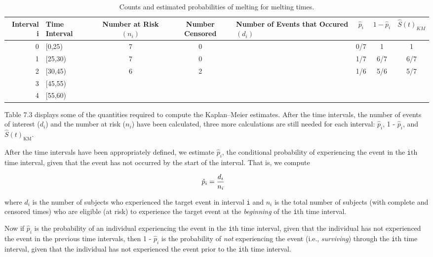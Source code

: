 \documentclass[
]{report}
\begin{document}
\begin{table}[!h]
\centering
\caption{\label{tab:tab93}Counts and estimated probabilities of melting for melting times.}
\centering
\begin{tabular}[t]{rlcc>{\centering\arraybackslash}p{2.5cm}ccc}
\toprule
Interval i & Time Interval & Number at Risk $(n_i)$ & Number Censored & Number of Events that Occured $(d_i)$ & $\hat{p}_i$ & $1 - \hat{p}_i$ & $\hat{S}(t)_{KM}$\\
\midrule
0 & {}[0,25) & 7 & 0 & 0 & 0/7 & 1 & 1\\
1 & {}[25,30) & 7 & 0 & 1 & 1/7 & 6/7 & 6/7\\
2 & {}[30,45) & 6 & 2 & 1 & 1/6 & 5/6 & 5/7\\
3 & {}[45,55) &  &  &  &  &  & \\
4 & {}[55,60) &  &  &  &  &  & \\
\bottomrule
\end{tabular}
\end{table}

Table 7.3 displays some of the quantities required to compute the Kaplan--Meier estimates. After the time intervals, the number of events of interest (\(d_i\)) and the number at risk (\(\scriptstyle n_i\)) have been calculated, three more calculations are still needed for each interval: \(\scriptstyle \hat p_i\), 1 - \(\scriptstyle \hat p_i\), and \(\scriptstyle \hat S(t)_{\text{KM}}\).

After the time intervals have been appropriately defined, we estimate \(\scriptstyle \hat p_i\), the conditional probability of experiencing the event in the \texttt{i}th time interval, given that the event has not occurred by the start of the interval. That is, we compute

\begin{align}
\hat p_i &= \frac{d_i}{n_i}
\notag
\end{align}

where \(\scriptstyle d_i\) is the number of subjects who experienced the target event in interval \texttt{i} and \(\scriptstyle n_i\) is the total number of subjects (with complete and censored times) who are eligible (at risk) to experience the target event at the \emph{beginning} of the \texttt{i}th time interval.

Now if \(\scriptstyle \hat p_i\) is the probability of an individual experiencing the event in the \texttt{i}th time interval, given that the individual has not experienced the event in the previous time intervals, then 1 - \(\scriptstyle \hat p_i\) is the probability of \emph{not} experiencing the event (i.e., \emph{surviving}) through the \texttt{i}th time interval, given that the individual has not experienced the event prior to the \texttt{i}th time interval.
\end{document}
